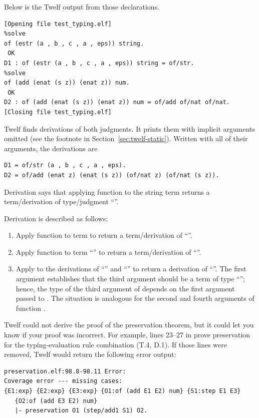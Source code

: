 Below is the Twelf output from those declarations.

\begin{verbatim}
[Opening file test_typing.elf]
%solve
of (estr (a , b , c , a , eps)) string.
 OK
D1 : of (estr (a , b , c , a , eps)) string = of/str.
%solve
of (add (enat (s z)) (enat z)) num.
 OK
D2 : of (add (enat (s z)) (enat z)) num = of/add of/nat of/nat.
[Closing file test_typing.elf]
\end{verbatim}

Twelf finds derivations of both judgments.
It prints them with implicit arguments omitted
(see the footnote in Section~\ref{sec:twelf-static}).
Written with all of their arguments, the derivations are
\begin{verbatim}
D1 = of/str (a , b , c , a , eps).
D2 = of/add (enat z) (enat (s z)) (of/nat z) (of/nat (s z)).
\end{verbatim}
Derivation  says that applying function 
to the string term
 returns a
term/derivation of type/judgment
``''.

Derivation  is described as follows:
\begin{enumerate}
\item Apply function  to term 
to return a term/derivation of ``''.
\item Apply function  to term ``''
to return a term/derivation of ``''.
\item Apply  to the derivations
of ``'' and ``''
to return a derivation of
``''.
The first argument  establishes
that the third argument should be a term of type
``'';
hence, the type of the third argument of 
depends on the first argument passed to .
The situation is analogous for the second and fourth
arguments of function .
\end{enumerate}

Twelf could not derive the proof of the preservation theorem,
but it could let you know if your proof was incorrect.
For example, lines 23--27 in 
prove preservation for the typing-evaluation rule combination
(T.4, D.1).
If those lines were removed, Twelf would return the following
error output:

\begin{verbatim}
preservation.elf:98.8-98.11 Error: 
Coverage error --- missing cases:
{E1:exp} {E2:exp} {E3:exp} {O1:of (add E1 E2) num} {S1:step E1 E3}
   {O2:of (add E3 E2) num}
   |- preservation O1 (step/add1 S1) O2.
\end{verbatim}

